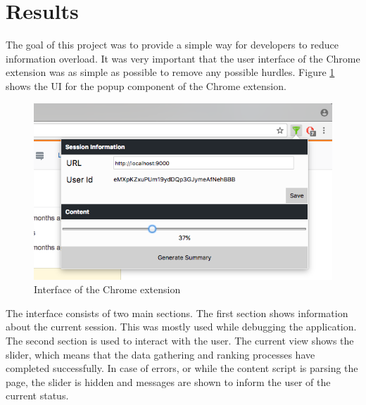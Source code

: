 \section{Results}\label{sec:results}
The goal of this project was to provide a simple way for developers to reduce information overload. It was very important that the user interface of the Chrome extension was as simple as possible to remove any possible hurdles. Figure \ref{fig:chromeExtensionInterfaceScreenshot} shows the UI for the popup component of the Chrome extension. 

\begin{figure}[H]
\centering
\includegraphics{Figures/ChromeUI}
\caption{Interface of the Chrome extension}
\label{fig:chromeExtensionInterfaceScreenshot}
\end{figure}

The interface consists of two main sections. The first section shows information about the current session. This was mostly used while debugging the application. The second section is used to interact with the user. The current view shows the slider, which means that the data gathering and ranking processes have completed successfully. In case of errors, or while the content script is parsing the page, the slider is hidden and messages are shown to inform the user of the current status. 


